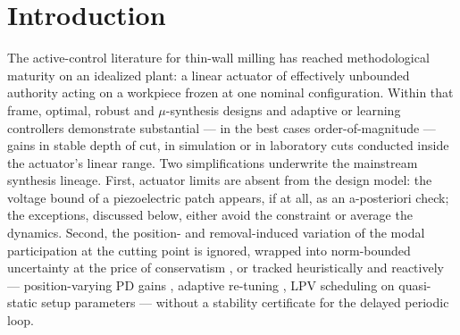 \documentclass[preprint,12pt]{elsarticle}
\begin{document}
\section{Introduction}
\label{sec:intro}

The active-control literature for thin-wall milling has reached
methodological maturity on an idealized plant: a linear actuator of
effectively unbounded authority acting on a workpiece frozen at one
nominal configuration. Within that frame, optimal, robust and
$\mu$-synthesis designs \cite{du2024robust,vandijk2012robust,
zhang2019robust} and adaptive or learning controllers
\cite{kleinwort2018adaptive,nasiri2025chatter} demonstrate substantial
--- in the best cases order-of-magnitude \cite{jmp2026spindle} ---
gains in stable depth of cut, in simulation or in laboratory cuts
conducted inside the actuator's linear range. Two simplifications
underwrite the mainstream synthesis lineage. First, actuator limits
are absent from the design model: the voltage bound of a piezoelectric
patch appears, if at all, as an a-posteriori check; the exceptions,
discussed below, either avoid the constraint or average the dynamics.
Second, the position- and removal-induced variation of the modal
participation at the cutting point is ignored, wrapped into
norm-bounded uncertainty at the price of conservatism
\cite{du2024robust}, or tracked heuristically and reactively ---
position-varying PD gains \cite{wang2019timespace}, adaptive re-tuning
\cite{kleinwort2018adaptive}, LPV scheduling on quasi-static setup
parameters \cite{brand2025lpv} --- without a stability certificate for
the delayed periodic loop.
\end{document}
